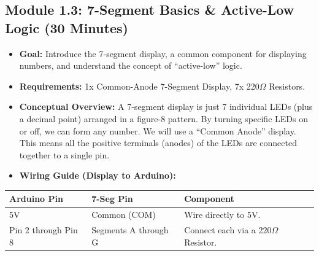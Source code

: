 \documentclass[11pt,a4paper]{article}
\begin{document}
\subsection*{Module 1.3: 7-Segment Basics \& Active-Low Logic (30 Minutes)}

\begin{itemize}
    \item \textbf{Goal:} Introduce the 7-segment display, a common component for displaying numbers, and understand the concept of ``active-low'' logic.
    \item \textbf{Requirements:} 1x Common-Anode 7-Segment Display, 7x 220$\Omega$ Resistors.
    \item \textbf{Conceptual Overview:} A 7-segment display is just 7 individual LEDs (plus a decimal point) arranged in a figure-8 pattern. By turning specific LEDs on or off, we can form any number. We will use a ``Common Anode'' display. This means all the positive terminals (anodes) of the LEDs are connected together to a single pin.
    \item \textbf{Wiring Guide (Display to Arduino):}
\end{itemize}

\begin{table}[h]
\centering
\begin{tabular}{lll}
\toprule
\textbf{Arduino Pin} & \textbf{7-Seg Pin} & \textbf{Component} \\
\midrule
5V & Common (COM) & Wire directly to 5V. \\
Pin 2 through Pin 8 & Segments A through G & Connect each via a 220$\Omega$ Resistor. \\
\bottomrule
\end{tabular}
\end{table}
\end{document}
